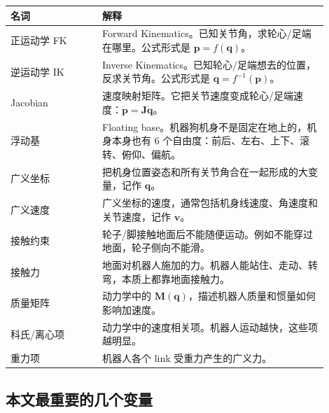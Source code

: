 \documentclass[UTF8,11pt,a4paper]{ctexart}
\newcommand{\bs}[1]{\bm{#1}}
\begin{document}
\begin{center}
\begin{tabular}{p{0.26\linewidth}p{0.64\linewidth}}
\toprule
名词 & 解释 \\
\midrule
正运动学 FK & Forward Kinematics。已知关节角，求轮心/足端在哪里。公式形式是 \(\bs p=f(\bs q)\)。\\
逆运动学 IK & Inverse Kinematics。已知轮心/足端想去的位置，反求关节角。公式形式是 \(\bs q=f^{-1}(\bs p)\)。\\
Jacobian & 速度映射矩阵。它把关节速度变成轮心/足端速度：\(\dot{\bs p}=\bs J\dot{\bs q}\)。\\
浮动基 & Floating base。机器狗机身不是固定在地上的，机身本身也有 6 个自由度：前后、左右、上下、滚转、俯仰、偏航。\\
广义坐标 & 把机身位置姿态和所有关节角合在一起形成的大变量，记作 \(\bs q\)。\\
广义速度 & 广义坐标的速度，通常包括机身线速度、角速度和关节速度，记作 \(\bs v\)。\\
接触约束 & 轮子/脚接触地面后不能随便运动。例如不能穿过地面，轮子侧向不能滑。\\
接触力 & 地面对机器人施加的力。机器人能站住、走动、转弯，本质上都靠地面接触力。\\
质量矩阵 & 动力学中的 \(\bs M(\bs q)\)，描述机器人质量和惯量如何影响加速度。\\
科氏/离心项 & 动力学中的速度相关项。机器人运动越快，这些项越明显。\\
重力项 & 机器人各个 link 受重力产生的广义力。\\
\bottomrule
\end{tabular}
\end{center}

\subsection{本文最重要的几个变量}
\end{document}
